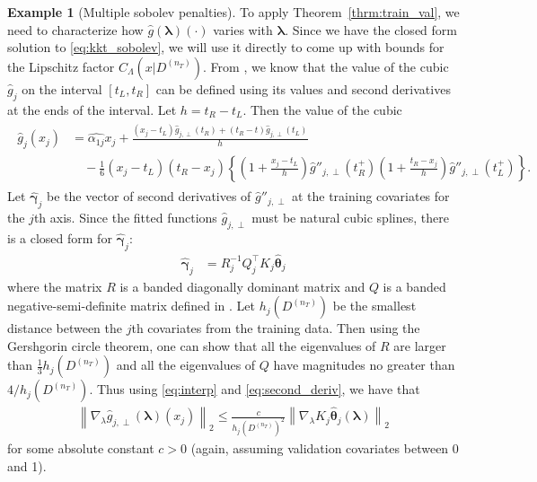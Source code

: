 \documentclass[12pt]{article} %
\theoremstyle{definition}
\newtheorem{example}{Example}
\begin{document}
\begin{example}[Multiple sobolev penalties]
	To apply Theorem~\ref{thrm:train_val}, we need to characterize how $\hat{g}(\boldsymbol{\lambda})(\cdot)$ varies with $\boldsymbol{\lambda}$.
	Since we have the closed form solution to \eqref{eq:kkt_sobolev}, we will use it directly to come up with bounds for the Lipschitz factor $C_\Lambda(x | D^{(n_T)})$.
	From \citet{green1993nonparametric}, we know that the value of the cubic $\hat{g}_j$ on the interval $[t_L, t_R]$ can be defined using its values and second derivatives at the ends of the interval.
	Let $h = t_R - t_L$.
	Then the value of the cubic
	\begin{align}
	\begin{split}
	\hat{g}_j(x_j)
	& = \hat{\alpha_{1j}} x_j
	+ \frac{(x_j - t_L) \hat{g}_{j, \perp} (t_R) + (t_R - t) \hat{g}_{j, \perp}(t_L)}{h}\\
	& \quad - \frac{1}{6}(x_j - t_L)(t_R - x_j) \left\{
	\left(
	1 + \frac{x_j - t_L}{h}
	\right) \hat{g}''_{j, \perp}(t_R^+)
	\left(
	1 + \frac{t_R - x_j}{h}
	\right) \hat{g}''_{j, \perp}(t_L^+)
	\right \}.
	\label{eq:interp}
	\end{split}
	\end{align}
	Let $\hat{\boldsymbol{\gamma}}_j$ be the vector of second derivatives of $\hat{g}''_{j, \perp}$ at the training covariates for the $j$th axis.
	Since the fitted functions $\hat{g}_{j, \perp}$ must be natural cubic splines, there is a closed form for $\hat{\boldsymbol{\gamma}}_j$:
	\begin{align}
	\hat{\boldsymbol{\gamma}}_j & = R^{-1}_j Q^\top_j K_j \hat{\boldsymbol{\theta}}_j
	\label{eq:second_deriv}
	\end{align}
	where the matrix $R$ is a banded diagonally dominant matrix and $Q$ is a banded negative-semi-definite matrix defined in \citet{green1993nonparametric}.
	Let $h_j(D^{(n_T)})$ be the smallest distance between the $j$th covariates from the training data.
	Then using the Gershgorin circle theorem, one can show that all the eigenvalues of $R$ are larger than $\frac{1}{3} h_j(D^{(n_T)})$ and all the eigenvalues of $Q$ have magnitudes no greater than $4/h_j(D^{(n_T)})$.
	Thus using \eqref{eq:interp} and \eqref{eq:second_deriv}, we have that
	\begin{align}
	\left \|
	\nabla_{\lambda} \hat{g}_{j, \perp}(\boldsymbol{\lambda})(x_j)
	\right \|_2
	\le
	\frac{c}{h_j(D^{(n_T)})^2}
	\left\|
	\nabla_{\lambda} K_j \hat{\boldsymbol{\theta}}_j(\boldsymbol{\lambda})
	\right \|_2
	\end{align}
	for some absolute constant $c > 0$ (again, assuming validation covariates between 0 and 1).
	

\end{example}
\end{document}
